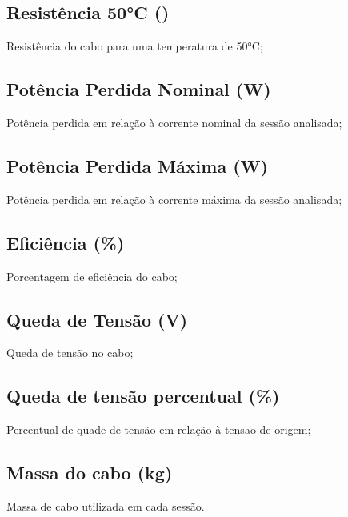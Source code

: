 \documentclass{article}
\begin{document}
\subsection{Resistência 50°C (\Omega)}
Resistência do cabo para uma temperatura de 50°C;

\subsection{Potência Perdida Nominal (W)}
Potência perdida em relação à corrente nominal da sessão analisada;

\subsection{Potência Perdida Máxima (W)}
Potência perdida em relação à corrente máxima da sessão analisada;

\subsection{Eficiência (\%)}
Porcentagem de eficiência do cabo;

\subsection{Queda de Tensão (V)}
Queda de tensão no cabo;

\subsection{Queda de tensão percentual (\%)}
Percentual de quade de tensão em relação à tensao de origem;

\subsection{Massa do cabo (kg)}
Massa de cabo utilizada em cada sessão.
\end{document}
